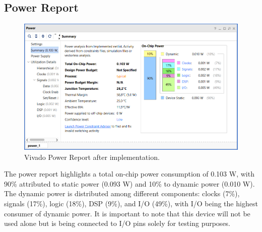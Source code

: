 \subsection{Power Report}
\begin{figure}[H]
    \centering
    \captionsetup{skip=10pt} 
    \includegraphics[width=\textwidth]{./images/Vivado/power_report.png}
    \caption{Vivado Power Report after implementation.}
    \label{fig:power_report}
\end{figure}
The power report highlights a total on-chip power consumption of 0.103 W, with 90\% attributed to static power (0.093 W) and 10\% to dynamic power (0.010 W). The dynamic power is distributed among different components: clocks (7\%), signals (17\%), logic (18\%), DSP (9\%), and I/O (49\%), with I/O being the highest consumer of dynamic power. It is important to note that this device will not be used alone but is being connected to I/O pins solely for testing purposes.




